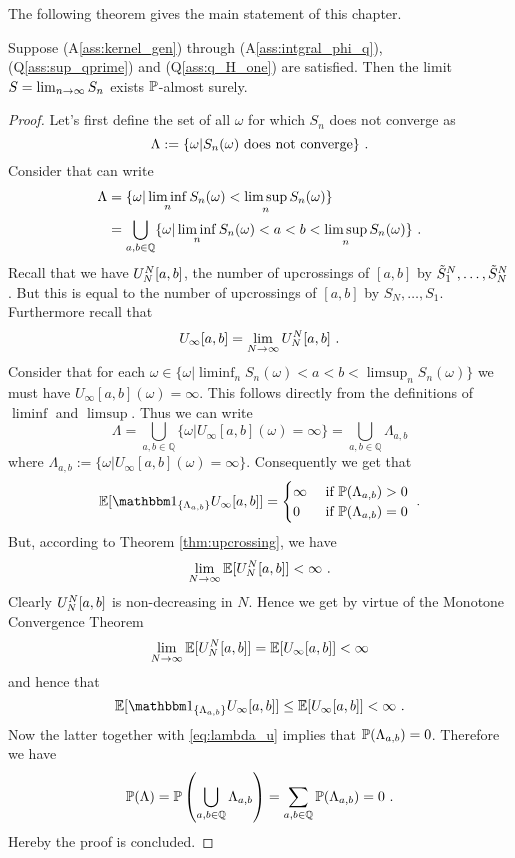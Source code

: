 The following theorem gives the main statement of this chapter. 
\begin{thm}
	\label{thm:existence_limit}
	Suppose (A\ref{ass:kernel_gen}) through (A\ref{ass:intgral_phi_q}), (Q\ref{ass:sup_qprime}) and (Q\ref{ass:q_H_one}) are satisfied. Then the limit
	$S = \lim_{n\to\infty} \sn{n}$
	exists $\P$-almost surely.
	\begin{proof}
		Let's first define the set of all $\omega$ for which $S_n$ does not converge as
		$$\Lambda := \{\omega | S_n(\omega) \textrm{ does not converge}\}\mdot$$
		Consider that can write
		\begin{align*}
			\Lambda &= \{\omega | \liminf_{n}S_n(\omega) < \limsup_{n} S_n(\omega)\}\\
			&= \bigcup_{a,b\in\mathbb{Q}}\{\omega | \liminf_{n}S_n(\omega) < a < b < \limsup_{n} S_n(\omega)\}\mdot
		\end{align*}
		Recall that we have $\UNab{N}$, the number of upcrossings of $[a,b]$ by $\StN{1}, \dots, \StN{N}$. But this is equal to the number of upcrossings of $[a,b]$ by $S_N, \dots, S_1$. Furthermore recall that 
		$$U_\infty[a,b] = \lim\limits_{N\to\infty} \UNab{N}\mdot$$
		Consider that for each $\omega \in \{\omega | \liminf_{n}S_n(\omega) < a < b < \limsup_{n} S_n(\omega)\}$ we must have $U_{\infty}[a,b](\omega) = \infty$. This follows directly from the definitions of $\liminf$ and $\limsup$. Thus we can write
		\begin{equation*}
		\Lambda = \bigcup_{a,b\in\mathbb{Q}}\{ \omega | U_\infty[a,b](\omega) = \infty\} = \bigcup_{a,b\in\mathbb{Q}} \Lambda_{a,b}
		\end{equation*}
		where $\Lambda_{a,b} := \{ \omega | U_\infty[a,b](\omega) = \infty\}$.
		Consequently we get that
		\begin{equation}
			\E[\I{\Lambda_{a,b}} U_\infty[a,b]] = \begin{cases}
			\infty &\textrm{ if } \P(\Lambda_{a,b})>0\\
			0 &\textrm{ if } \P(\Lambda_{a,b})=0\\
			\end{cases}\mdot
			\label{eq:lambda_u}
		\end{equation}
		But, according to Theorem \ref{thm:upcrossing}, we have
		$$\lim\limits_{N\to\infty}\E[\UNab{N}]<\infty\mdot$$
		Clearly $\UNab{N}$ is non-decreasing in $N$. Hence we get by virtue of the Monotone Convergence Theorem 
		$$\lim\limits_{N\to\infty}\E[\UNab{N}] = \E[U_\infty[a,b]] <\infty$$	
		and hence that
		$$\E[\I{\Lambda_{a,b}} U_\infty[a,b]] \leq \E[U_\infty[a,b]] < \infty\mdot$$
		Now the latter together with \eqref{eq:lambda_u} implies that $\P(\Lambda_{a,b}) = 0$. Therefore we have
		\begin{equation*}
			\P(\Lambda) = \P\left(\bigcup_{a,b\in\mathbb{Q}}\Lambda_{a,b}\right) = \sum_{a,b \in \mathbb{Q}} \P(\Lambda_{a,b}) = 0 \mdot
		\end{equation*}
		Hereby the proof is concluded.
	\end{proof}
\end{thm}


